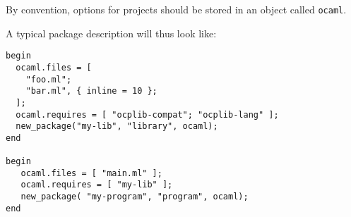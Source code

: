 By convention, options for projects should be stored in an object
called {\tt ocaml}.

A typical package description will thus look like:

\begin{verbatim}
begin
  ocaml.files = [
    "foo.ml";
    "bar.ml", { inline = 10 };
  ];
  ocaml.requires = [ "ocplib-compat"; "ocplib-lang" ];
  new_package("my-lib", "library", ocaml);
end

begin
   ocaml.files = [ "main.ml" ];
   ocaml.requires = [ "my-lib" ];
   new_package( "my-program", "program", ocaml);
end
\end{verbatim}
